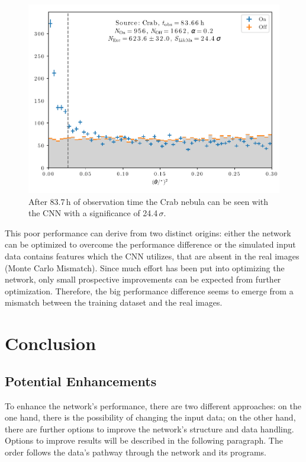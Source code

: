\begin{figure}
    \centering
    \includegraphics[scale=0.8]{Plots/Theta_Plot.pdf}
    \caption{After \num{83.7}\,\si{\hour} of observation time the Crab nebula can be seen with the CNN with a significance of \num{24.4}\,$\sigma$.}
    \label{fig:theta_plot}
\end{figure}

This poor performance can derive from two distinct origins:
either the network can be optimized to overcome the performance difference
or the simulated input data contains features which the CNN utilizes,
that are absent in the real images (Monte Carlo Mismatch).
Since much effort has been put into optimizing the network,
only small prospective improvements can be expected from further optimization.
Therefore, the big performance difference seems to emerge from a mismatch between the training dataset and the real images.


\chapter{Conclusion}
\section{Potential Enhancements}
To enhance the network's performance, there are two different approaches:
on the one hand, there is the possibility of changing the input data;
on the other hand, there are further options to improve the network's structure and data handling.
Options to improve results will be described in the following paragraph.
The order follows the data's pathway through the network and its programs.

